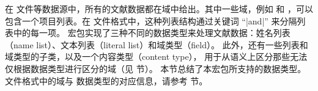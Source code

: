 在  文件等数据源中，所有的文献数据都在域中给出。其中一些域，例如  和 ，可以包含一个项目列表。在 \BibTeX 文件格式中，这种列表结构通过关键词 “|and|” 来分隔列表中的每一项。
\biblatex 宏包实现了三种不同的数据类型来处理文献数据：姓名列表（name list）、文本列表（literal list）和域类型（field）。
此外，还有一些列表和域类型的子类，以及一个内容类型（content type），
用于从语义上区分那些无法仅根据数据类型进行区分的域（见  节）。
本节总结了本宏包所支持的数据类型。\BibTeX 文件格式中的域与 \biblatex 数据类型的对应信息，请参考  节。

